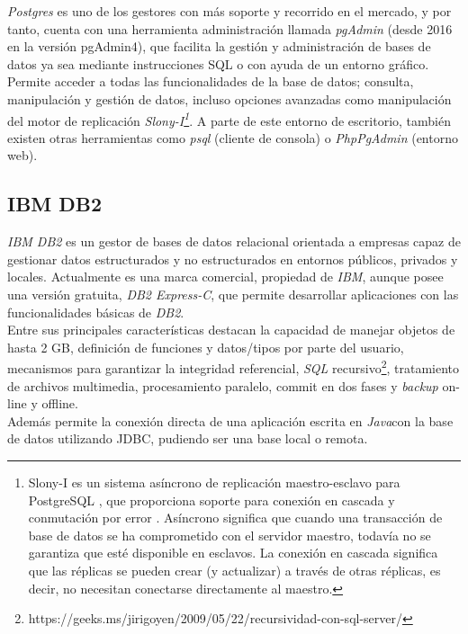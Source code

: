 \documentclass[3pt]{article}
\begin{document}
\emph{Postgres} es uno de los gestores con más soporte y recorrido en el mercado, y por tanto, cuenta con una herramienta administración llamada \emph{pgAdmin} (desde 2016 en la versión pgAdmin4), que facilita la gestión y administración de bases de datos ya sea mediante instrucciones SQL o con ayuda de un entorno gráfico. Permite acceder a todas las funcionalidades de la base de datos; consulta, manipulación y gestión de datos, incluso opciones avanzadas como manipulación del motor de replicación \emph{Slony-I\footnote {Slony-I es un sistema asíncrono de replicación maestro-esclavo para PostgreSQL , que proporciona soporte para conexión en cascada y conmutación por error . Asíncrono significa que cuando una transacción de base de datos se ha comprometido con el servidor maestro, todavía no se garantiza que esté disponible en esclavos. La conexión en cascada significa que las réplicas se pueden crear (y actualizar) a través de otras réplicas, es decir, no necesitan conectarse directamente al maestro.\cite{SLO:1}}}. A parte de este entorno de escritorio, también existen otras herramientas como \emph{psql} (cliente de consola) o \emph{PhpPgAdmin} (entorno web).\cite{PG:1}

\subsection{IBM DB2}

\emph{IBM DB2} es un gestor de bases de datos relacional orientada a empresas capaz de gestionar datos estructurados y no estructurados en entornos públicos, privados y locales.\cite{DB2:1} Actualmente es una marca comercial, propiedad de \emph{IBM}, aunque posee una versión gratuita, \emph{DB2 Express-C}\cite{DB2:2}, que permite desarrollar aplicaciones con las funcionalidades básicas de \emph{DB2}.\\

Entre sus principales características destacan la capacidad de manejar objetos de hasta 2 GB, definición de funciones y datos/tipos por parte del usuario, mecanismos para garantizar la integridad referencial, \emph{SQL} recursivo\footnote{https://geeks.ms/jirigoyen/2009/05/22/recursividad-con-sql-server/}, tratamiento de archivos multimedia, procesamiento paralelo, commit en dos fases y \emph{backup} on-line y offline.\\
Además permite la conexión directa de una aplicación escrita en \emph{Java}con la base de datos utilizando JDBC,  pudiendo ser una base local o remota.\cite{DB2:3}\\
\end{document}
